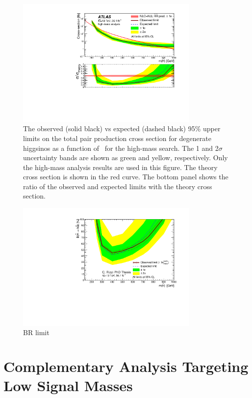 \begin{figure}[htbp]
	\centering
	\includegraphics[width=0.8\textwidth]{figures/ewk_prod/interpretation/limit_HM}
	\caption{The observed (solid black) vs expected (dashed black) 95\% upper limits on the total pair production cross section for degenerate higgsinos as a function of \mhino\ for the high-mass search. The 1 and 2$\sigma$ uncertainty bands are shown as green and yellow, respectively. Only the high-mass analysis results are used in this figure. The theory cross section is shown in the red curve. The bottom panel shows the ratio of the observed and expected limits with the theory cross section.} 
	\label{fig:exclusion_high}
\end{figure}

\begin{figure}[htbp]
	\centering
	\includegraphics[width=0.8\textwidth]{figures/ewk_prod/interpretation/br_limit_HM.pdf}
	\caption{BR limit} 
	\label{fig:exclusion_high}
\end{figure}



\section{Complementary Analysis Targeting Low Signal Masses}


